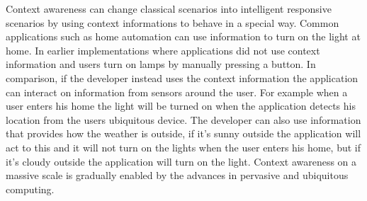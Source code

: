 Context awareness can change classical scenarios into intelligent responsive scenarios by using context informations to behave in a special way. Common applications such as home automation can use information to turn on the light at home. In earlier implementations where applications did not use context information and users turn on lamps by manually pressing a button. 
In comparison, if the developer instead uses the context information the application can interact on information from sensors around the user. For example when a user enters his home the light will be turned on when the application detects his location from the users ubiquitous device. The developer can also use information that provides how the weather is outside, if it's sunny outside the application will act to this and it will not turn on the lights when the user enters his home, but if it's cloudy outside the application will turn on the light. 
Context awareness on a massive scale is gradually enabled by the advances in pervasive and ubiquitous computing. 